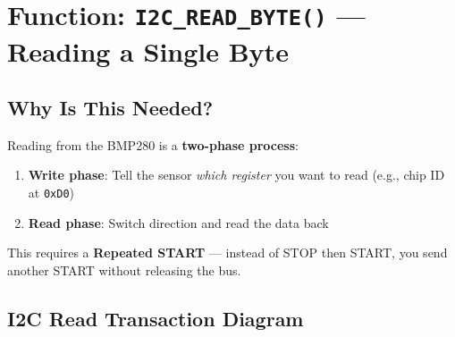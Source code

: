 \documentclass[12pt, a4paper]{article}
\begin{document}
\section{Function: \texttt{I2C\_READ\_BYTE()} --- Reading a Single Byte}

\subsection{Why Is This Needed?}

Reading from the BMP280 is a \textbf{two-phase process}:
\begin{enumerate}[leftmargin=2em]
    \item \textbf{Write phase}: Tell the sensor \textit{which register} you want to read (e.g., chip ID at \texttt{0xD0})
    \item \textbf{Read phase}: Switch direction and read the data back
\end{enumerate}

This requires a \textbf{Repeated START} --- instead of STOP then START, you send another START without releasing the bus.

\subsection{I2C Read Transaction Diagram}
\end{document}
